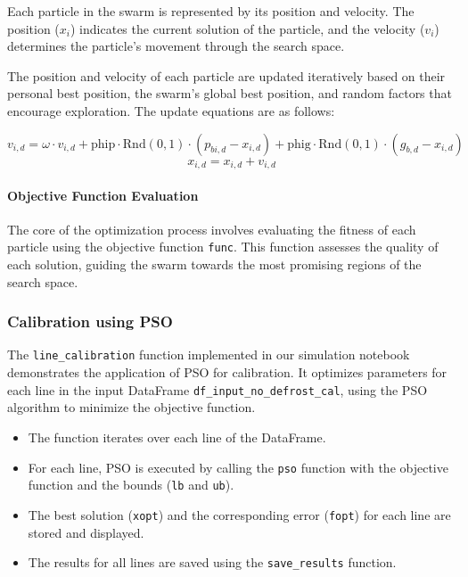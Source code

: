 \documentclass{report}
\begin{document}
Each particle in the swarm is represented by its position and velocity. The position (\(x_i\)) indicates the current solution of the particle, and the velocity (\(v_i\)) determines the particle's movement through the search space.

The position and velocity of each particle are updated iteratively based on their personal best position, the swarm's global best position, and random factors that encourage exploration. The update equations are as follows:

\begin{equation}
v_{i,d} = \omega \cdot v_{i,d} + \text{phip} \cdot \text{Rnd}(0, 1) \cdot (p_{bi,d} - x_{i,d}) + \text{phig} \cdot \text{Rnd}(0, 1) \cdot (g_{b,d} - x_{i,d})
\end{equation}
\begin{equation}
x_{i,d} = x_{i,d} + v_{i,d}
\end{equation}

\paragraph{Objective Function Evaluation}

The core of the optimization process involves evaluating the fitness of each particle using the objective function \texttt{func}. This function assesses the quality of each solution, guiding the swarm towards the most promising regions of the search space.

\subsubsection{Calibration using PSO}

The \texttt{line\_calibration} function implemented in our simulation notebook demonstrates the application of PSO for calibration. It optimizes parameters for each line in the input DataFrame \texttt{df\_input\_no\_defrost\_cal}, using the PSO algorithm to minimize the objective function.

\begin{itemize}
    \item The function iterates over each line of the DataFrame.
    \item For each line, PSO is executed by calling the \texttt{pso} function with the objective function and the bounds (\texttt{lb} and \texttt{ub}).
    \item The best solution (\texttt{xopt}) and the corresponding error (\texttt{fopt}) for each line are stored and displayed.
    \item The results for all lines are saved using the \texttt{save\_results} function.
\end{itemize}
\end{document}
